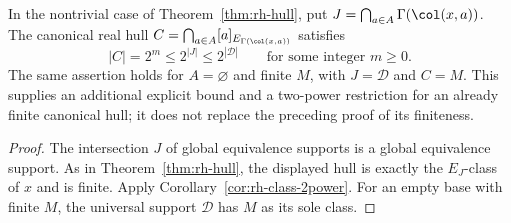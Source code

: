\begin{corollary}
\label{cor:rh-hull-2power}
In the nontrivial case of Theorem~\ref{thm:rh-hull}, put
$J=\bigcap_{a\in A}\Gamma(\col(x,a))$.  The canonical real hull
$C=\bigcap_{a\in A}[a]_{E_{\Gamma(\col(x,a))}}$ satisfies
\[
       |C|=2^m\le 2^{|J|}\le 2^{|\mathcal D|}
       \qquad\text{for some integer }m\ge0.
\]
The same assertion holds for $A=\varnothing$ and finite $M$, with
$J=\mathcal D$ and $C=M$. This supplies an additional explicit bound
and a two-power restriction for an already finite canonical hull;
it does not replace the preceding proof of its finiteness.
\end{corollary}
\begin{proof}
The intersection $J$ of global equivalence supports is a global
equivalence support. As in Theorem~\ref{thm:rh-hull}, the displayed
hull is exactly the $E_J$-class of $x$ and is finite. Apply
Corollary~\ref{cor:rh-class-2power}. For an empty base with finite
$M$, the universal support $\mathcal D$ has $M$ as its sole class.
\end{proof}


